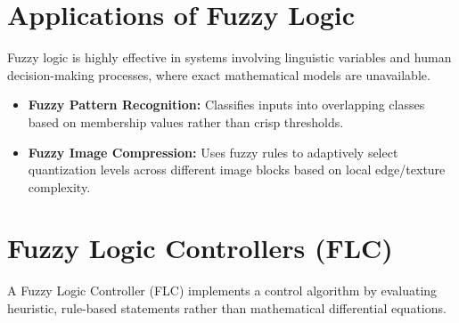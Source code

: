 \documentclass[12pt,a4paper]{article}
\begin{document}
\section{Applications of Fuzzy Logic}

Fuzzy logic is highly effective in systems involving linguistic variables and human decision-making processes, where exact mathematical models are unavailable.

\begin{itemize}[leftmargin=*, itemsep=3pt]
  \item \textbf{Fuzzy Pattern Recognition:} Classifies inputs into overlapping classes based on membership values rather than crisp thresholds.
  \item \textbf{Fuzzy Image Compression:} Uses fuzzy rules to adaptively select quantization levels across different image blocks based on local edge/texture complexity.
\end{itemize}

\section{Fuzzy Logic Controllers (FLC)}

A Fuzzy Logic Controller (FLC) implements a control algorithm by evaluating heuristic, rule-based statements rather than mathematical differential equations.
\end{document}
